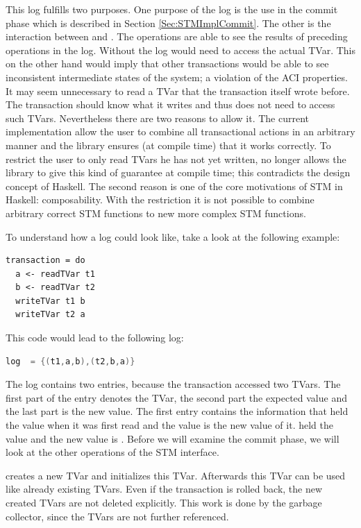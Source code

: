 This log fulfills two purposes. One purpose of the log is the use in the commit phase which is described in Section \ref{Sec:STMImplCommit}.
The other is the interaction between  and . The  operations are able to see the results 
of preceding  operations in the log. Without the log  would need to access the actual TVar. This on the 
other hand would imply that other transactions would be able to see inconsistent intermediate states of the system;
a violation of the ACI properties. It may seem unnecessary to read a TVar that the transaction itself wrote before.
The transaction should know what it writes and thus does not need to access such TVars. Nevertheless there are two reasons 
to allow it. The current implementation allow the user to combine all transactional actions in an arbitrary manner and 
the library ensures (at compile time) that it works correctly. To restrict the user to only read TVars he has
not yet written, no longer allows the library to give this kind of guarantee at compile time; this contradicts
the design concept of Haskell. The second reason is one of the core motivations of STM in Haskell: composability.
With the restriction it is not possible to combine arbitrary correct STM functions to new more complex STM
functions. 

To understand how a log could look like, take a look at the following example:
\begin{lstlisting}
transaction = do
  a <- readTVar t1
  b <- readTVar t2
  writeTVar t1 b
  writeTVar t2 a
\end{lstlisting}
This code would lead to the following log:
\begin{lstlisting}[language=C]
 log  = {(t1,a,b),(t2,b,a)} 
\end{lstlisting}
The log contains two entries, because the transaction accessed two TVars. The first part of the entry denotes the TVar, the second
part the expected value and the last part is the new value. The first entry contains the information that 
held the value  when it was first read and the value  is the new value of it.  held the value  
and the new value is . Before we will examine the commit phase, we will look at the other operations of the STM interface.

 creates a new TVar and initializes this TVar. Afterwards this TVar can be used like already existing TVars.
Even if the transaction is rolled back, the new created TVars are not deleted explicitly. This work is done by the garbage
collector, since the TVars are not further referenced. 

